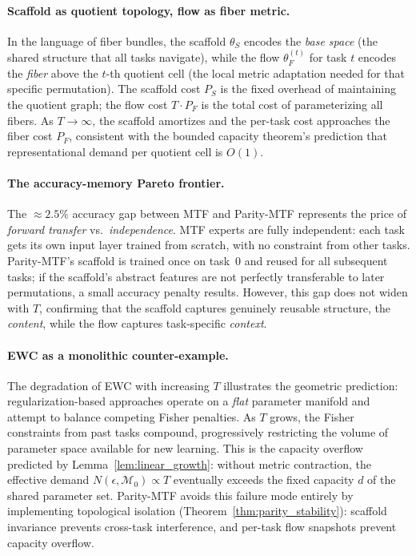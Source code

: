 \documentclass{article}
\begin{document}
\paragraph{Scaffold as quotient topology, flow as fiber metric.}
In the language of fiber bundles, the scaffold $\theta_S$ encodes the \emph{base space} (the shared structure that all tasks navigate), while the flow $\theta_F^{(t)}$ for task $t$ encodes the \emph{fiber} above the $t$-th quotient cell (the local metric adaptation needed for that specific permutation).
The scaffold cost $P_S$ is the fixed overhead of maintaining the quotient graph; the flow cost $T \cdot P_F$ is the total cost of parameterizing all fibers.
As $T \to \infty$, the scaffold amortizes and the per-task cost approaches the fiber cost $P_F$, consistent with the bounded capacity theorem's prediction that representational demand per quotient cell is $O(1)$.

\paragraph{The accuracy-memory Pareto frontier.}
The $\approx\!2.5\%$ accuracy gap between MTF and Parity-MTF represents the price of \emph{forward transfer} vs.\ \emph{independence}.
MTF experts are fully independent: each task gets its own input layer trained from scratch, with no constraint from other tasks.
Parity-MTF's scaffold is trained once on task~0 and reused for all subsequent tasks; if the scaffold's abstract features are not perfectly transferable to later permutations, a small accuracy penalty results.
However, this gap does not widen with $T$, confirming that the scaffold captures genuinely reusable structure, the \emph{content}, while the flow captures task-specific \emph{context}.

\paragraph{EWC as a monolithic counter-example.}
The degradation of EWC with increasing $T$ illustrates the geometric prediction: regularization-based approaches operate on a \emph{flat} parameter manifold and attempt to balance competing Fisher penalties.
As $T$ grows, the Fisher constraints from past tasks compound, progressively restricting the volume of parameter space available for new learning.
This is the capacity overflow predicted by Lemma~\ref{lem:linear_growth}: without metric contraction, the effective demand $N(\epsilon, \mathcal{M}_0) \propto T$ eventually exceeds the fixed capacity $d$ of the shared parameter set.
Parity-MTF avoids this failure mode entirely by implementing topological isolation (Theorem~\ref{thm:parity_stability}): scaffold invariance prevents cross-task interference, and per-task flow snapshots prevent capacity overflow.
\end{document}
